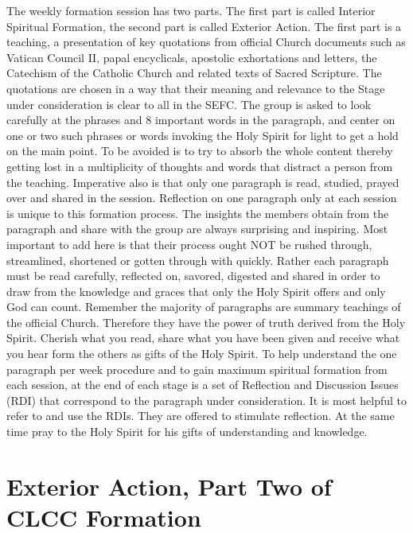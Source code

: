 \documentclass{article}
\begin{document}
The weekly formation session has two parts. The first part is called Interior
Spiritual Formation, the second part is called Exterior Action. The first part
is a teaching, a presentation of key quotations from official Church documents
such as Vatican Council II, papal encyclicals, apostolic exhortations and
letters, the Catechism of the Catholic Church and related texts of Sacred
Scripture. The quotations are chosen in a way that their meaning and relevance
to the Stage under consideration is clear to all in the SEFC. The group is asked
to look carefully at the phrases and
8
important words in the paragraph, and center on one or two such phrases or words
invoking the Holy Spirit for light to get a hold on the main point. To be
avoided is to try to absorb the whole content thereby getting lost in a
multiplicity of thoughts and words that distract a person from the
teaching. Imperative also is that only one paragraph is read, studied, prayed
over and shared in the session. Reflection on one paragraph only at each session
is unique to this formation process. The insights the members obtain from the
paragraph and share with the group are always surprising and inspiring. Most
important to add here is that their process ought NOT be rushed through,
streamlined, shortened or gotten through with quickly. Rather each paragraph
must be read carefully, reflected on, savored, digested and shared in order to
draw from the knowledge and graces that only the Holy Spirit offers and only God
can count. Remember the majority of paragraphs are summary teachings of the
official Church. Therefore they have the power of truth derived from the Holy
Spirit. Cherish what you read, share what you have been given and receive what
you hear form the others as gifts of the Holy Spirit.
To help understand the one paragraph per week procedure and to gain maximum
spiritual formation from each session, at the end of each stage is a set of
Reflection and Discussion Issues (RDI) that correspond to the paragraph under
consideration. It is most helpful to refer to and use the RDIs. They are offered
to stimulate reflection. At the same time pray to the Holy Spirit for his gifts
of understanding and knowledge.

\section{Exterior Action, Part Two of CLCC Formation}
\end{document}
